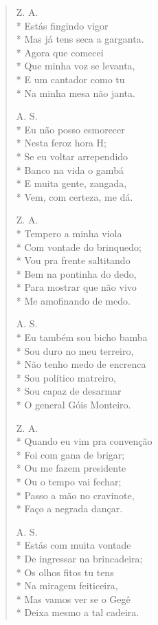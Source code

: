 \begin{verse}
Z. A.\\*
Estás fingindo vigor\\*
Mas já tens seca a garganta.\\*
Agora que comecei\\*
Que minha voz se levanta,\\*
E um cantador como tu\\*
Na minha mesa não janta.

A. S.\\*
Eu não posso esmorecer\\*
Nesta feroz hora H;\\*
Se eu voltar arrependido\\*
Banco na vida o gambá\\*
E muita gente, zangada,\\*
Vem, com certeza, me dá.

Z. A.\\*
Tempero a minha viola\\*
Com vontade do brinquedo;\\*
Vou pra frente saltitando\\*
Bem na pontinha do dedo,\\*
Para mostrar que não vivo\\*
Me amofinando de medo.

A. S.\\*
Eu também sou bicho bamba\\*
Sou duro no meu terreiro,\\*
Não tenho medo de encrenca\\*
Sou político matreiro,\\*
Sou capaz de desarmar\\*
O general Góis Monteiro.

Z. A.\\*
Quando eu vim pra convenção\\*
Foi com gana de brigar;\\*
Ou me fazem presidente\\*
Ou o tempo vai fechar;\\*
Passo a mão no cravinote,\\*
Faço a negrada dançar.

A. S.\\*
Estás com muita vontade\\*
De ingressar na brincadeira;\\*
Os olhos fitos tu tens\\*
Na miragem feiticeira,\\*
Mas vamos ver se o Gegê\\*
Deixa mesmo a tal cadeira.


\end{verse}
